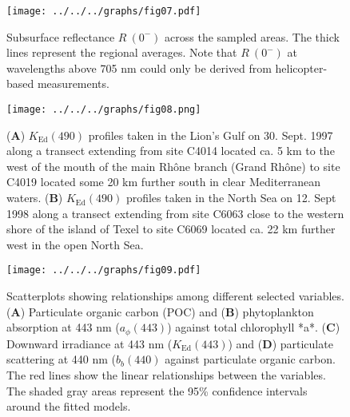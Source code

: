 \documentclass[essd, manuscript]{copernicus}
\begin{document}
\clearpage

\begin{figure}[t]
    \texttt{[image: ../../../graphs/fig07.pdf]}
    \caption{Subsurface reflectance $R~(0^{-})$ across the sampled areas. The thick lines represent the regional averages. Note that $R~(0^{-})$ at wavelengths above 705 nm could only be derived from helicopter-based measurements.}
\end{figure}

\clearpage

\begin{figure}[t]
    \texttt{[image: ../../../graphs/fig08.png]}
    \caption{(\textbf{A}) $K_{\text{Ed}}(490)$ profiles taken in the Lion's Gulf on 30. Sept. 1997 along a transect extending from site C4014 located ca. 5 km to the west of the mouth of the main Rhône branch (Grand Rhône) to site C4019 located some 20 km further south in clear Mediterranean waters. (\textbf{B}) $K_{\text{Ed}}(490)$ profiles taken in the North Sea on 12. Sept 1998 along a transect extending from site C6063 close to the western shore of the island of Texel to site C6069 located ca. 22 km further west in the open North Sea.}
\end{figure}

\clearpage

\begin{figure}[t]
    \texttt{[image: ../../../graphs/fig09.pdf]}
    \caption{Scatterplots showing relationships among different selected variables. (\textbf{A}) Particulate organic carbon (POC) and (\textbf{B}) phytoplankton absorption at 443 nm ($a_{\phi}(443)$) against total chlorophyll *a*. (\textbf{C}) Downward irradiance at 443 nm ($K_{\text{Ed}}(443)$) and (\textbf{D}) particulate scattering at 440 nm ($b_{b}(440)$ against particulate organic carbon. The red lines show the linear relationships between the variables. The shaded gray areas represent the 95\% confidence intervals around the fitted models.}
\end{figure}




\end{document}

